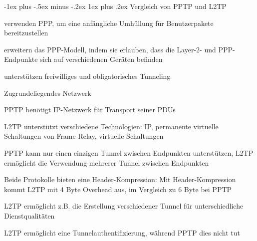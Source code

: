 \documentclass[a4paper]{article}
\makeatletter
\renewcommand{\subsubsection}{\@startsection{subsubsection}{3}{0mm}%
 {-1ex plus -.5ex minus -.2ex}%
 {1ex plus .2ex}%
 {\normalfont\small\bfseries}}
\makeatother
\begin{document}
\begin{multicols}{3}
      \subsubsection{Vergleich von PPTP und L2TP}
      \begin{itemize*}
            \item verwenden PPP, um eine anfängliche Umhüllung für Benutzerpakete bereitzustellen
            \item erweitern das PPP-Modell, indem sie erlauben, dass die Layer-2- und PPP-Endpunkte sich auf verschiedenen Geräten befinden
            \item unterstützen freiwilliges und obligatorisches Tunneling
            \item Zugrundeliegendes Netzwerk
            \begin{itemize*}
                  \item PPTP benötigt IP-Netzwerk für Transport seiner PDUs
                  \item L2TP unterstützt verschiedene Technologien: IP, permanente virtuelle Schaltungen von Frame Relay, virtuelle Schaltungen
            \end{itemize*}
            \item PPTP kann nur einen einzigen Tunnel zwischen Endpunkten unterstützen, L2TP ermöglicht die Verwendung mehrerer Tunnel zwischen Endpunkten
            \item Beide Protokolle bieten eine Header-Kompression:  Mit Header-Kompression kommt L2TP mit 4 Byte Overhead aus, im Vergleich zu 6 Byte bei PPTP
            \item L2TP ermöglicht z.B. die Erstellung verschiedener Tunnel für unterschiedliche Dienstqualitäten
            \item L2TP ermöglicht eine Tunnelauthentifizierung, während PPTP dies nicht tut
      \end{itemize*}


\end{multicols}
\end{document}
